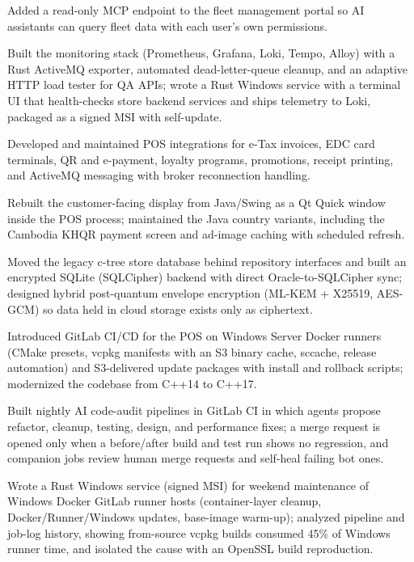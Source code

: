 \begin{cventries}
{\begin{cvitems}
      \item { Added a read-only MCP endpoint to the fleet management portal so AI assistants can query fleet data with each user's own permissions.}
      \item { Built the monitoring stack (Prometheus, Grafana, Loki, Tempo, Alloy) with a Rust ActiveMQ exporter, automated dead-letter-queue cleanup, and an adaptive HTTP load tester for QA APIs; wrote a Rust Windows service with a terminal UI that health-checks store backend services and ships telemetry to Loki, packaged as a signed MSI with self-update.}
      \item { Developed and maintained POS integrations for e-Tax invoices, EDC card terminals, QR and e-payment, loyalty programs, promotions, receipt printing, and ActiveMQ messaging with broker reconnection handling.}
      \item { Rebuilt the customer-facing display from Java/Swing as a Qt Quick window inside the POS process; maintained the Java country variants, including the Cambodia KHQR payment screen and ad-image caching with scheduled refresh.}
      \item { Moved the legacy c-tree store database behind repository interfaces and built an encrypted SQLite (SQLCipher) backend with direct Oracle-to-SQLCipher sync; designed hybrid post-quantum envelope encryption (ML-KEM + X25519, AES-GCM) so data held in cloud storage exists only as ciphertext.}
      \item { Introduced GitLab CI/CD for the POS on Windows Server Docker runners (CMake presets, vcpkg manifests with an S3 binary cache, sccache, release automation) and S3-delivered update packages with install and rollback scripts; modernized the codebase from C++14 to C++17.}
      \item { Built nightly AI code-audit pipelines in GitLab CI in which agents propose refactor, cleanup, testing, design, and performance fixes; a merge request is opened only when a before/after build and test run shows no regression, and companion jobs review human merge requests and self-heal failing bot ones.}
      \item { Wrote a Rust Windows service (signed MSI) for weekend maintenance of Windows Docker GitLab runner hosts (container-layer cleanup, Docker/Runner/Windows updates, base-image warm-up); analyzed pipeline and job-log history, showing from-source vcpkg builds consumed 45\% of Windows runner time, and isolated the cause with an OpenSSL build reproduction.}

\end{cvitems}}
\end{cventries}
